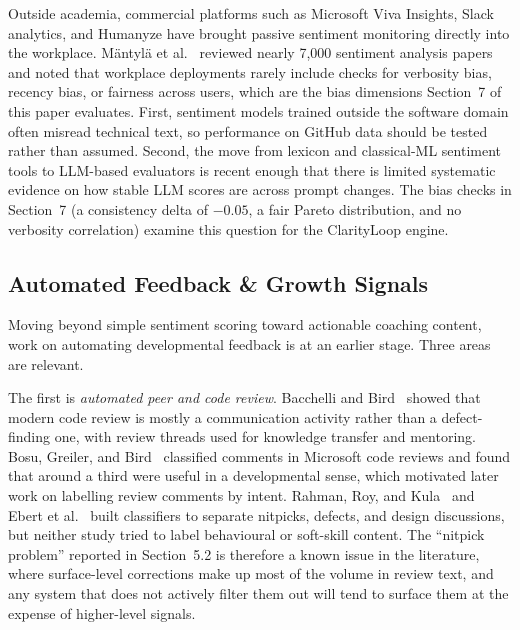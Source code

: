 \documentclass[a4paper,UKenglish,cleveref,autoref]{lipics-v2021}
\begin{document}
Outside academia, commercial platforms such as Microsoft Viva Insights, Slack analytics, and Humanyze have brought passive sentiment monitoring directly into the workplace. M{\"a}ntyl{\"a} et al.~\cite{mantyla2018evolution} reviewed nearly 7,000 sentiment analysis papers and noted that workplace deployments rarely include checks for verbosity bias, recency bias, or fairness across users, which are the bias dimensions Section~7 of this paper evaluates. First, sentiment models trained outside the software domain often misread technical text, so performance on GitHub data should be tested rather than assumed. Second, the move from lexicon and classical-ML sentiment tools to LLM-based evaluators is recent enough that there is limited systematic evidence on how stable LLM scores are across prompt changes. The bias checks in Section~7 (a consistency delta of $-0.05$, a fair Pareto distribution, and no verbosity correlation) examine this question for the ClarityLoop engine.

\subsection{Automated Feedback \& Growth Signals}
Moving beyond simple sentiment scoring toward actionable coaching content, work on automating developmental feedback is at an earlier stage. Three areas are relevant.

The first is \textit{automated peer and code review}. Bacchelli and Bird~\cite{bacchelli2013expectations} showed that modern code review is mostly a communication activity rather than a defect-finding one, with review threads used for knowledge transfer and mentoring. Bosu, Greiler, and Bird~\cite{bosu2015characteristics} classified comments in Microsoft code reviews and found that around a third were useful in a developmental sense, which motivated later work on labelling review comments by intent. Rahman, Roy, and Kula~\cite{rahman2017predicting} and Ebert et al.~\cite{ebert2019confusion} built classifiers to separate nitpicks, defects, and design discussions, but neither study tried to label behavioural or soft-skill content. The ``nitpick problem'' reported in Section~5.2 is therefore a known issue in the literature, where surface-level corrections make up most of the volume in review text, and any system that does not actively filter them out will tend to surface them at the expense of higher-level signals.
\end{document}
